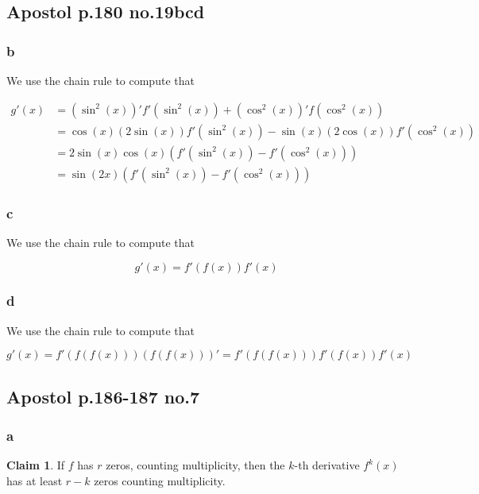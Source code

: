 \documentclass[12pt,letterpaper]{article}
\theoremstyle{definition}
\newtheorem*{claim}{Claim}
\begin{document}
\subsection*{Apostol p.180 no.19bcd}

\subsubsection*{b}

We use the chain rule to compute that

\begin{align*}
  g'(x) &= (\sin^2(x))'f'(\sin^2(x)) + (\cos^2(x))'f(\cos^2(x)) \\
        &= \cos(x)(2\sin(x))f'(\sin^2(x)) - \sin(x)(2\cos(x))f'(\cos^2(x)) \\
        &= 2\sin(x)\cos(x)(f'(\sin^2(x)) - f'(\cos^2(x))) \\
        &= \sin(2x)(f'(\sin^2(x)) - f'(\cos^2(x)))
\end{align*}

\subsubsection*{c}

We use the chain rule to compute that 

\[
  g'(x) = f'(f(x))f'(x)
\]

\subsubsection*{d}

We use the chain rule to compute that

\[
  g'(x) = f'(f(f(x)))(f(f(x)))' = f'(f(f(x)))f'(f(x))f'(x)
\]

\subsection*{Apostol p.186-187 no.7}

\subsubsection*{a}

\begin{claim}
  If $f$ has $r$ zeros, counting multiplicity, then the $k$-th derivative
  $f^k(x)$ has at least $r - k$ zeros counting multiplicity.
\end{claim}
\end{document}
